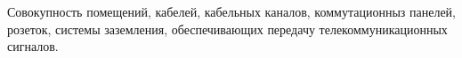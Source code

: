 Совокупность помещений, кабелей, кабельных каналов,
коммутационныз панелей, розеток, системы заземления,
обеспечивающих передачу телекоммуникационных сигналов.